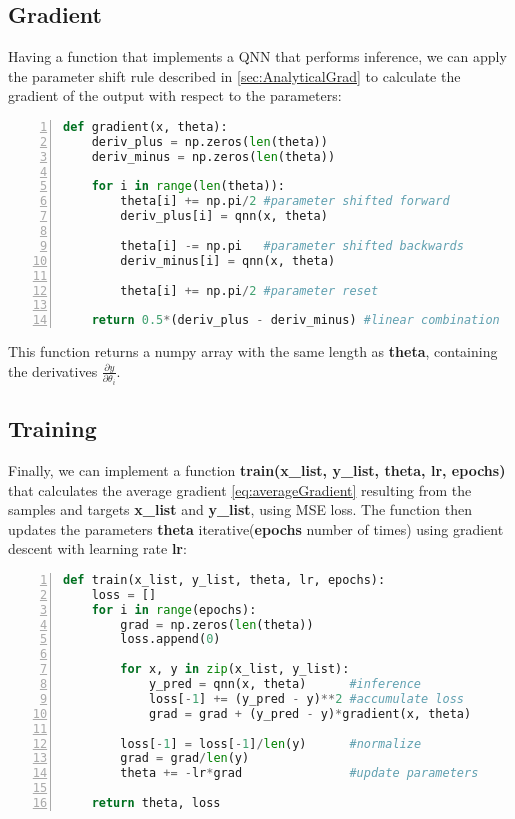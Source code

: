 \subsection{Gradient}\label{sec:GradientImplementation}
Having a function that implements a QNN that performs inference, we can apply the parameter shift rule described in \cref{sec:AnalyticalGrad} to calculate the gradient of the output with respect to the parameters:

\begin{lstlisting}[language=python, numbers=left]
def gradient(x, theta):
    deriv_plus = np.zeros(len(theta))
    deriv_minus = np.zeros(len(theta))
    
    for i in range(len(theta)):
        theta[i] += np.pi/2 #parameter shifted forward
        deriv_plus[i] = qnn(x, theta) 
        
        theta[i] -= np.pi   #parameter shifted backwards
        deriv_minus[i] = qnn(x, theta)
        
        theta[i] += np.pi/2 #parameter reset
    
    return 0.5*(deriv_plus - deriv_minus) #linear combination
\end{lstlisting}
This function returns a numpy array with the same length as \textbf{theta}, containing the derivatives $\frac{\partial y}{\partial \theta_i}$.

\subsection{Training}\label{sec:QNNTraining}

Finally, we can implement a function \textbf{train(x\_list, y\_list, theta, lr, epochs)} that calculates the average gradient \cref{eq:averageGradient} resulting from the samples and targets \textbf{x\_list} and \textbf{y\_list}, using MSE loss. The function then updates the parameters \textbf{theta} iterative(\textbf{epochs} number of times) using gradient descent with learning rate \textbf{lr}:

\begin{lstlisting}[language=python, numbers=left]
def train(x_list, y_list, theta, lr, epochs):
    loss = []
    for i in range(epochs):
        grad = np.zeros(len(theta))
        loss.append(0)
        
        for x, y in zip(x_list, y_list):
            y_pred = qnn(x, theta)      #inference
            loss[-1] += (y_pred - y)**2 #accumulate loss        
            grad = grad + (y_pred - y)*gradient(x, theta)
        
        loss[-1] = loss[-1]/len(y)      #normalize
        grad = grad/len(y)
        theta += -lr*grad               #update parameters
    
    return theta, loss
\end{lstlisting}


